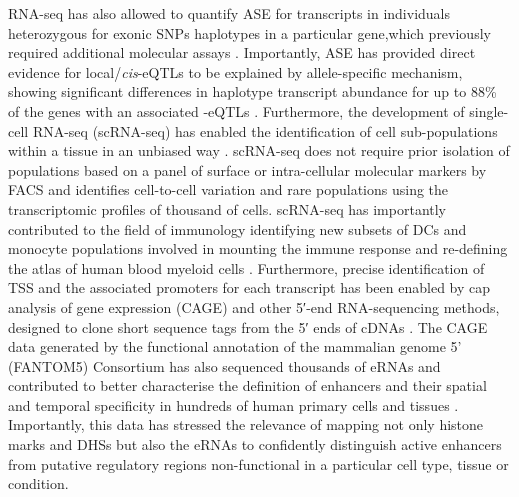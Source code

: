 RNA-seq has also allowed to quantify ASE for transcripts in individuals heterozygous for exonic SNPs haplotypes in a particular gene,which previously required additional molecular assays \parencite{Yan2002}. Importantly, ASE has provided direct evidence for local/\textit{cis}-eQTLs to be explained by allele-specific mechanism, showing significant differences in haplotype transcript abundance for up to 88\% of the genes with an associated -eQTLs \parencite{Pickrell2010}. Furthermore, the development of single-cell RNA-seq (scRNA-seq) has enabled the identification of cell sub-populations within a tissue in an unbiased way \parencite{Tang2009, Tang2010}. scRNA-seq does not require prior isolation of populations based on a panel of surface or intra-cellular molecular markers by FACS and identifies cell-to-cell variation and rare populations using the transcriptomic profiles of thousand of cells. scRNA-seq has importantly contributed to the field of immunology identifying new subsets of DCs and monocyte populations involved in mounting the immune response and re-defining the atlas of human blood myeloid cells \parencite{Jaitin2014, Villani2017}. 
Furthermore, precise identification of TSS and the associated promoters for each transcript  has been enabled by cap analysis of gene expression (CAGE) and other 5′-end RNA-sequencing methods, designed to clone short sequence tags from the 5′ ends of cDNAs \parencite{Yamashita2011,FANTOM2014}. The CAGE data generated by the functional annotation of the mammalian genome 5' (FANTOM5) Consortium has also sequenced thousands of eRNAs and contributed to better characterise the definition of enhancers and their spatial and temporal specificity in hundreds of human primary cells and tissues \parencite{Andersson2014}. Importantly, this data has stressed the relevance of mapping not only histone marks and DHSs but also the eRNAs to confidently distinguish active enhancers from putative regulatory regions non-functional in a particular cell type, tissue or condition.


